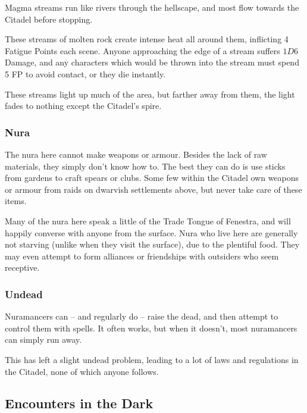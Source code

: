 \begin{multicols}{2}
Magma streams run like rivers through the hellscape, and most flow towards the Citadel before stopping.

These streams of molten rock create intense heat all around them, inflicting 4 Fatigue Points each scene.
Anyone approaching the edge of a stream suffers $1D6$ Damage, and any characters which would be thrown into the stream must spend 5 FP to avoid contact, or they die instantly.

These streams light up much of the area, but farther away from them, the light fades to nothing except the Citadel's spire.

\subsubsection{Nura}

The nura here cannot make weapons or armour.
Besides the lack of raw materials, they simply don't know how to.
The best they can do is use sticks from gardens to craft spears or clubs.
Some few within the Citadel own weapons or armour from raids on dwarvish settlements above, but never take care of these items.

Many of the nura here speak a little of the Trade Tongue of Fenestra, and will happily converse with anyone from the surface.
Nura who live here are generally not starving (unlike when they visit the surface), due to the plentiful food.
They may even attempt to form alliances or friendships with outsiders who seem receptive.


\encNura
{}

\subsubsection{Undead}

Nuramancers can -- and regularly do -- raise the dead, and then attempt to control them with spells.
It often works, but when it doesn't, most nuramancers can simply run away.

This has left a slight undead problem, leading to a lot of laws and regulations in the Citadel, none of which anyone follows.

\subsection{Encounters in the Dark}


\end{multicols}
